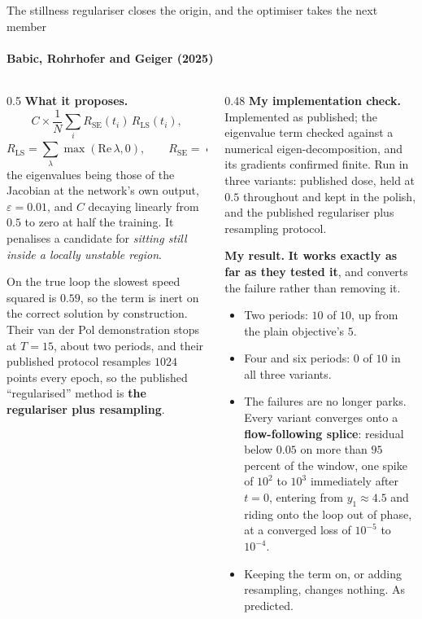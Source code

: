 \documentclass[aspectratio=169,10pt]{beamer}
\newcommand{\hl}[1]{{\color{accent}\textbf{#1}}}
\newcommand{\bad}[1]{{\color{warm}\textbf{#1}}}
\begin{document}
\begin{frame}[shrink=25]{The stillness regulariser closes the origin, and the optimiser takes the next member}
  \framesubtitle{Babic, Rohrhofer and Geiger (2025)}
  \vspace{1mm}
  \begin{columns}[T]
    \begin{column}{0.5\textwidth}
      \textbf{What it proposes.}
      \[ C \times \frac{1}{N} \sum_i R_{\mathrm{SE}}(t_i)\, R_{\mathrm{LS}}(t_i), \]
      \[ R_{\mathrm{LS}} = \sum_{\lambda} \max(\mathrm{Re}\,\lambda, 0),
         \qquad
         R_{\mathrm{SE}} = \exp\!\left(-\|\dot y_\theta\|^2/\varepsilon\right), \]
      the eigenvalues being those of the Jacobian at the network's own output,
      $\varepsilon = 0.01$, and $C$ decaying linearly from $0.5$ to zero at half
      the training. It penalises a candidate for \emph{sitting still inside a
      locally unstable region}.
      \medskip

      {\small On the true loop the slowest speed squared is $0.59$, so the term
       is inert on the correct solution by construction. Their van der Pol
       demonstration stops at $T = 15$, about two periods, and their published
       protocol resamples $1024$ points every epoch, so the published
       ``regularised'' method is \hl{the regulariser plus resampling}.}
    \end{column}
    \begin{column}{0.48\textwidth}
      \textbf{My implementation check.} Implemented as published; the eigenvalue
      term checked against a numerical eigen-decomposition, and its gradients
      confirmed finite. Run in three variants: published dose, held at $0.5$
      throughout and kept in the polish, and the published regulariser plus
      resampling protocol.
      \medskip

      \textbf{My result.} \hl{It works exactly as far as they tested it}, and
      converts the failure rather than removing it.
      \begin{itemize}\small
        \item Two periods: $10$ of $10$, up from the plain objective's $5$.
        \item Four and six periods: $0$ of $10$ in all three variants.
        \item The failures are no longer parks. Every variant converges onto a
              \bad{flow-following splice}: residual below $0.05$ on more than
              $95$ percent of the window, one spike of $10^2$ to $10^3$
              immediately after $t = 0$, entering from $y_1 \approx 4.5$ and
              riding onto the loop out of phase, at a converged loss of
              $10^{-5}$ to $10^{-4}$.
        \item Keeping the term on, or adding resampling, changes nothing. As
              predicted.
      \end{itemize}
    \end{column}
  \end{columns}
\end{frame}
\end{document}
